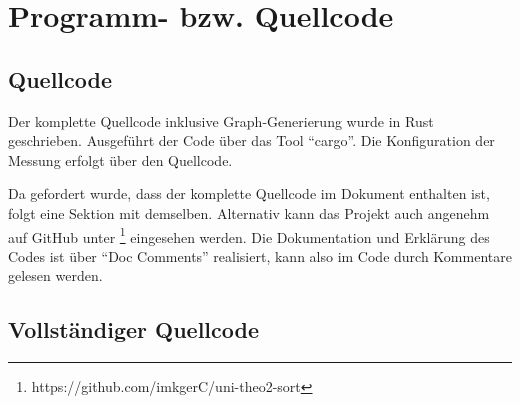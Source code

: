\chapter{Programm- bzw. Quellcode}
\section{Quellcode}
Der komplette Quellcode inklusive Graph-Generierung wurde in Rust geschrieben. Ausgeführt der Code über das Tool \enquote{cargo}. Die Konfiguration der Messung erfolgt über den Quellcode.

Da gefordert wurde, dass der komplette Quellcode im Dokument enthalten ist, folgt eine Sektion mit demselben. Alternativ kann das Projekt auch angenehm auf GitHub unter \footnote{https://github.com/imkgerC/uni-theo2-sort} eingesehen werden. Die Dokumentation und Erklärung des Codes ist über \enquote{Doc Comments} realisiert, kann also im Code durch Kommentare gelesen werden.
\section{Vollständiger Quellcode}

